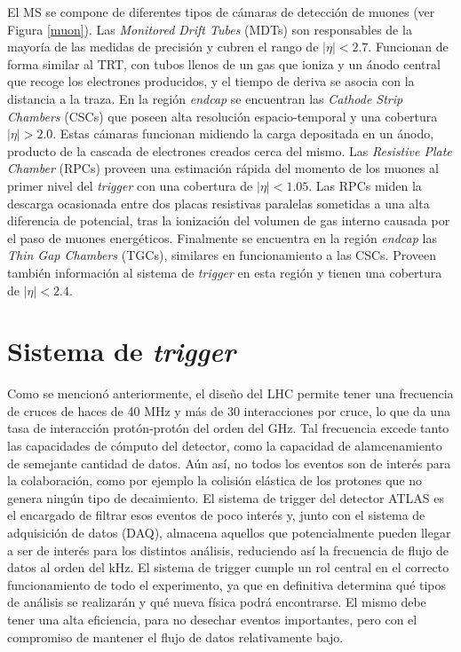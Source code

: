 El MS se compone de diferentes tipos de cámaras de detección de muones (ver Figura \ref{muon}). Las \textit{Monitored Drift Tubes} (MDTs) son responsables de la mayoría de las medidas de precisión y cubren el rango de $|\eta|<2.7$. Funcionan de forma similar al TRT, con tubos llenos de un gas que ioniza y un ánodo central que recoge los electrones producidos, y el tiempo de deriva se asocia con la distancia a la traza. En la región \textit{endcap} se encuentran las \textit{Cathode Strip Chambers} (CSCs) que poseen alta resolución espacio-temporal y una cobertura $|\eta|>2.0$. Estas cámaras funcionan midiendo la carga depositada en un ánodo, producto de la cascada de electrones creados cerca del mismo. Las \textit{Resistive Plate Chamber} (RPCs) proveen una estimación rápida del momento de los muones al primer nivel del \textit{trigger} con una cobertura de $|\eta|<1.05$. Las RPCs miden la descarga ocasionada entre dos placas resistivas paralelas sometidas a una alta diferencia de potencial, tras la ionización del volumen de gas interno causada por el paso de muones energéticos. Finalmente se encuentra en la región \textit{endcap} las \textit{Thin Gap Chambers} (TGCs), similares en funcionamiento a las CSCs. Proveen también información al sistema de \textit{trigger} en esta región y tienen una cobertura de $|\eta|<2.4$.

\section{Sistema de \textit{trigger}}

Como se mencionó anteriormente, el diseño del LHC permite tener una frecuencia de cruces de haces de 40 MHz y más de 30  interacciones por cruce, lo que da una tasa de interacción protón-protón del orden del GHz. Tal frecuencia excede tanto las capacidades de cómputo del detector, como la capacidad de alamcenamiento de semejante cantidad de datos. Aún así, no todos los eventos son de interés para la colaboración, como por ejemplo la colisión elástica de los protones que no genera ningún tipo de decaimiento. El sistema de trigger del detector ATLAS \cite{TRIG-2016-01} es el encargado de filtrar esos eventos de poco interés y, junto con el sistema de adquisición de datos (DAQ), almacena aquellos que potencialmente pueden llegar a ser de interés para los distintos análisis, reduciendo así la frecuencia de flujo de datos al orden del kHz. El sistema de trigger cumple un rol central en el correcto funcionamiento de todo el experimento, ya que en definitiva determina qué tipos de análisis se realizarán y qué nueva física podrá encontrarse. El mismo debe tener una alta eficiencia, para no desechar eventos importantes, pero con el compromiso de mantener el flujo de datos relativamente bajo. 

